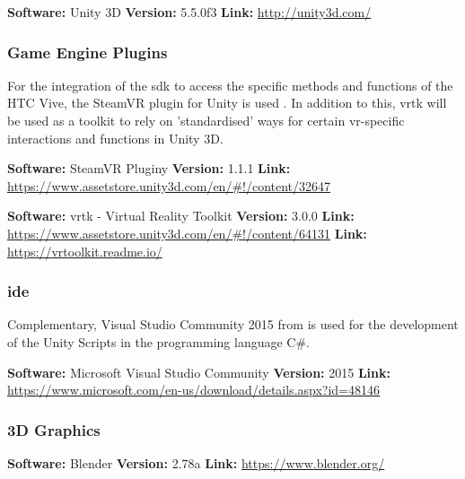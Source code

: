 \textbf{Software:} Unity 3D \newline
\textbf{Version:} 5.5.0f3 \newline
\textbf{Link:} \url{http://unity3d.com/}


\subsubsection{Game Engine Plugins}
For the integration of the \gls{sdk} to access the specific methods and functions of the HTC Vive, the SteamVR plugin for Unity is used \citep{Valve2016a}.
In addition to this, \gls{vrtk} will be used as a toolkit to rely on 'standardised' ways for certain \gls{vr}-specific interactions and functions in Unity 3D.

\cite{Sysdia2017}

\textbf{Software:} SteamVR Pluginy \newline
\textbf{Version:} 1.1.1 \newline
\textbf{Link:} \url{https://www.assetstore.unity3d.com/en/#!/content/32647}


\textbf{Software:} \gls{vrtk} - Virtual Reality Toolkit \newline
\textbf{Version:} 3.0.0 \newline
\textbf{Link:} \url{https://www.assetstore.unity3d.com/en/#!/content/64131} \newline
\textbf{Link:} \url{https://vrtoolkit.readme.io/}


\subsubsection{\gls{ide}}
Complementary, Visual Studio Community 2015 from \cite{Microsoft2015} is used for the development of the Unity Scripts in the programming language C\#.

\textbf{Software:} Microsoft Visual Studio Community \newline
\textbf{Version:} 2015 \newline
\textbf{Link:} \url{https://www.microsoft.com/en-us/download/details.aspx?id=48146}
 

\subsubsection{3D Graphics}

\cite{Blender2016}

\textbf{Software:} Blender \newline
\textbf{Version:} 2.78a \newline
\textbf{Link:} \url{https://www.blender.org/}







